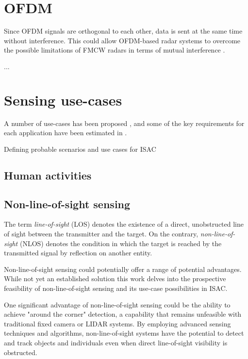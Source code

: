 \section{OFDM}

Since OFDM signals are orthogonal to each other, data is sent at the same time without interference. This could allow OFDM-based radar systems to overcome the possible limitations of FMCW radars in terms of mutual interference \cite{Goppelt_Blöcher_Menzel_2010}.
%

...


\section{Sensing use-cases}

A number of use-cases has been proposed \cite{Mandelli_Henninger_Bauhofer_Wild_2023}, \cite{Wang_Varshney_Gentile_Blandino_Chuang_Golmie_2022} and some of the  key requirements for each application have been estimated in \cite{Wild_Braun_Viswanathan_2021}.

Defining probable scenarios and use cases for ISAC 


\subsection{Human activities}



\subsection{Non-line-of-sight sensing}

The term \textit{line-of-sight} (LOS)  denotes the existence of a direct, unobstructed line of sight between the transmitter and the target. On the contrary, \textit{non-line-of-sight} (NLOS) denotes the condition in which the target is reached by the transmitted signal by reflection on another entity.

Non-line-of-sight sensing could potentially offer a range of potential advantages. While not yet an established solution this work delves into the prospective feasibility of non-line-of-sight sensing and its use-case possibilities in ISAC.

One significant advantage of non-line-of-sight sensing could be the ability to achieve "around the corner" detection, a capability that remains unfeasible with traditional fixed camera or LIDAR systems. By employing advanced sensing techniques and algorithms, non-line-of-sight systems have the potential to detect and track objects and individuals even when direct line-of-sight visibility is obstructed.

